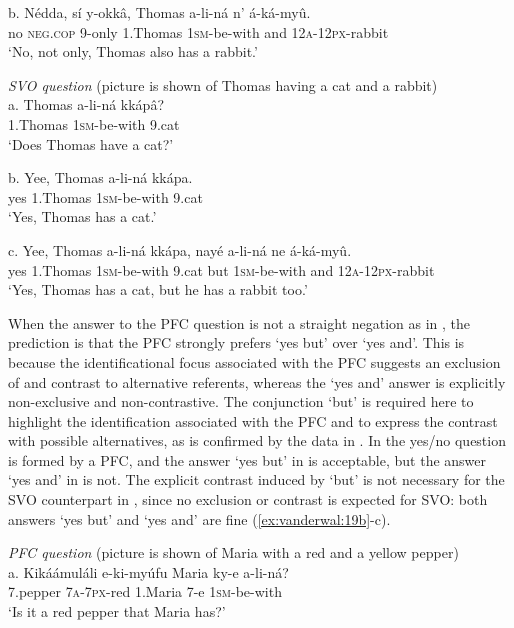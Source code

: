 \documentclass[output=paper]{langsci/langscibook}
\begin{document}
\ea
\gll   b.  Nédda,  sí    y-okkâ,  Thomas  a-li-ná    n’  á-ká-myû.\\
         no  \textsc{neg}.\textsc{cop}  9-only  1.Thomas  \textsc{1sm}-be-with  and  \textsc{12a}-\textsc{12px}-rabbit\\
\glt     ‘No, not only, Thomas also has a rabbit.’
\z

\ea
{\textit{SVO question}}
       (picture is shown of Thomas having a cat and a rabbit)\\
\gll a.  Thomas  a-li-ná  kkápâ?\\
       1.Thomas  \textsc{1sm}-be-with  9.cat\\
\glt   ‘Does Thomas have a cat?’
\z

\ea
\gll b.  Yee,   Thomas  a-li-ná  kkápa.\\
       yes  1.Thomas  \textsc{1sm}-be-with  9.cat\\
\glt   ‘Yes, Thomas has a cat.’
\z

\ea
\gll   c.   Yee,  Thomas    a-li-ná    kkápa,  nayé  a-li-ná    ne  á-ká-myû.\\
       yes  1.Thomas  \textsc{1sm}-be-with  9.cat   but    \textsc{1sm}-be-with  and  \textsc{12a}-\textsc{12px}-rabbit\\
\glt   ‘Yes, Thomas has a cat, but he has a rabbit too.’
\z

When the answer to the PFC question is not a straight negation as in , the prediction is that the PFC strongly prefers ‘yes but’ over ‘yes and’. This is because the identificational focus associated with the PFC suggests an exclusion of and contrast to alternative referents, whereas the ‘yes and’ answer is explicitly non-exclusive and non-contrastive. The conjunction ‘but’ is required here to highlight the identification associated with the PFC and to express the contrast with possible alternatives, as is confirmed by the data in . In  the yes/no question is formed by a PFC, and the answer ‘yes but’ in  is acceptable, but the answer ‘yes and’ in  is not. The explicit contrast induced by ‘but’ is not necessary for the SVO counterpart in , since no exclusion or contrast is expected for SVO: both answers ‘yes but’ and ‘yes and’ are fine (\ref{ex:vanderwal:19b}-c).

\ea
{\textit{PFC question}}
     (picture is shown of Maria with a red and a yellow pepper)\\
\gll   a.  Kikáámuláli  e-ki-myúfu  Maria    ky-e  a-li-ná?\\
         7.pepper  \textsc{7a}-\textsc{7px}-red  1.Maria  7-e  \textsc{1sm}-be-with\\
\glt     ‘Is it a red pepper that Maria has?’
\z
\end{document}
